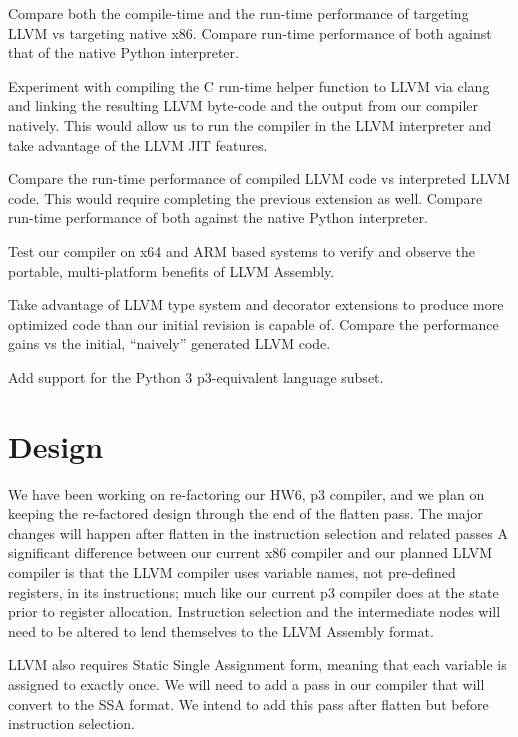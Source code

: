 \documentclass[11pt]{article}
\newenvironment{packed_item}{
\begin{itemize}
  \setlength{\itemsep}{1pt}
  \setlength{\parskip}{0pt}
  \setlength{\parsep}{0pt}
}{\end{itemize}}
\begin{document}
\begin{packed_item}
\item Compare both the compile-time and the run-time performance of
  targeting LLVM vs targeting native x86. Compare run-time performance
  of both against that of the native Python interpreter.
\item Experiment with compiling the C run-time helper function to LLVM
  via clang\cite{clang.llvm.org}
  and linking the resulting LLVM byte-code and the output
  from our compiler natively. This would allow us to run the compiler
  in the LLVM interpreter and take advantage of the LLVM JIT features.
\item Compare the run-time performance of compiled LLVM code vs
  interpreted LLVM code. This would require completing the previous
  extension as well. Compare run-time performance
  of both against the native Python interpreter.
\item Test our compiler on x64 and ARM based systems to verify and
  observe the portable, multi-platform benefits of LLVM Assembly.
\item Take advantage of LLVM type system and decorator extensions to
  produce more optimized code than our initial revision is capable of.
  Compare the performance gains vs the initial, ``naively'' generated
  LLVM code.
\item Add support for the Python 3 p3-equivalent language subset.
\end{packed_item}

\section{Design}

We have been working on re-factoring our HW6, p3 compiler,
and we plan on keeping
the re-factored design through the end of the flatten pass. The major
changes will happen after flatten in the instruction selection and related passes
A significant difference between our current x86
compiler and our planned LLVM compiler is that the LLVM compiler
uses variable names, not pre-defined registers, in its instructions;
much like our current p3
compiler does at the state prior to register allocation. Instruction
selection and the intermediate nodes will need to be altered to lend
themselves to the LLVM Assembly format.

LLVM also requires Static Single Assignment form,
meaning that each variable is assigned to exactly once.
We will need to add a pass in our compiler that will convert to the
SSA format. We
intend to add this pass after flatten but before instruction
selection.
\end{document}
